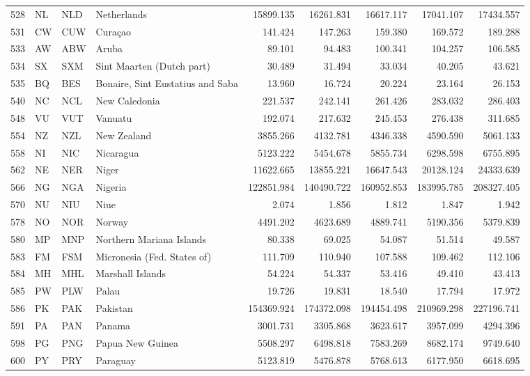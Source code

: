 {\begin{longtable}{rlllrrrrr}
 528 & NL & NLD & Netherlands & 15899.135 & 16261.831 & 16617.117 & 17041.107 & 17434.557 \\
 531 & CW & CUW & Curaçao & 141.424 & 147.263 & 159.380 & 169.572 & 189.288 \\
 533 & AW & ABW & Aruba & 89.101 & 94.483 & 100.341 & 104.257 & 106.585 \\
 534 & SX & SXM & Sint Maarten (Dutch part) & 30.489 & 31.494 & 33.034 & 40.205 & 43.621 \\
 535 & BQ & BES & Bonaire, Sint Eustatius and Saba & 13.960 & 16.724 & 20.224 & 23.164 & 26.153 \\
 540 & NC & NCL & New Caledonia & 221.537 & 242.141 & 261.426 & 283.032 & 286.403 \\
 548 & VU & VUT & Vanuatu & 192.074 & 217.632 & 245.453 & 276.438 & 311.685 \\
 554 & NZ & NZL & New Zealand & 3855.266 & 4132.781 & 4346.338 & 4590.590 & 5061.133 \\
 558 & NI & NIC & Nicaragua & 5123.222 & 5454.678 & 5855.734 & 6298.598 & 6755.895 \\
 562 & NE & NER & Niger & 11622.665 & 13855.221 & 16647.543 & 20128.124 & 24333.639 \\
 566 & NG & NGA & Nigeria & 122851.984 & 140490.722 & 160952.853 & 183995.785 & 208327.405 \\
 570 & NU & NIU & Niue & 2.074 & 1.856 & 1.812 & 1.847 & 1.942 \\
 578 & NO & NOR & Norway & 4491.202 & 4623.689 & 4889.741 & 5190.356 & 5379.839 \\
 580 & MP & MNP & Northern Mariana Islands & 80.338 & 69.025 & 54.087 & 51.514 & 49.587 \\
 583 & FM & FSM & Micronesia (Fed. States of) & 111.709 & 110.940 & 107.588 & 109.462 & 112.106 \\
 584 & MH & MHL & Marshall Islands & 54.224 & 54.337 & 53.416 & 49.410 & 43.413 \\
 585 & PW & PLW & Palau & 19.726 & 19.831 & 18.540 & 17.794 & 17.972 \\
 586 & PK & PAK & Pakistan & 154369.924 & 174372.098 & 194454.498 & 210969.298 & 227196.741 \\
 591 & PA & PAN & Panama & 3001.731 & 3305.868 & 3623.617 & 3957.099 & 4294.396 \\
 598 & PG & PNG & Papua New Guinea & 5508.297 & 6498.818 & 7583.269 & 8682.174 & 9749.640 \\
 600 & PY & PRY & Paraguay & 5123.819 & 5476.878 & 5768.613 & 6177.950 & 6618.695 \\

\end{longtable}}
